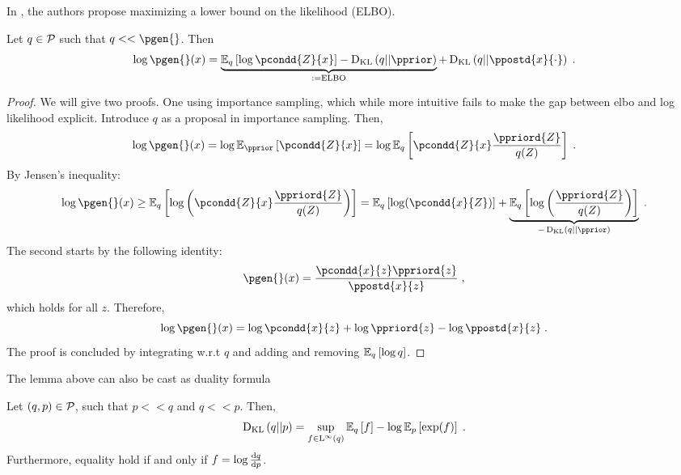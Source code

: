 In \cite{kingma2013autoencoding}, the authors propose maximizing a lower bound on the likelihood (ELBO).
\begin{lemma}
    Let $q \in \mathcal{P}_{}$ such that $q << \pgen{}$. Then
    \begin{equation}
        \label{eq:vae:elbo}
        \log \pgen{}(\lstate) = \underbrace{\PE{q}{\log\pcondd{Z}{\lstate}} - \kl{q}{\pprior}}_{\eqdef \text{ELBO}} + \kl{q}{\ppostd{\lstate}{\cdot}} \eqsp.
    \end{equation}
\end{lemma}
\begin{proof}
    We will give two proofs. One using importance sampling, which while more intuitive fails to make the gap between elbo and log likelihood explicit.
    Introduce $q$ as a proposal in importance sampling. Then, 
    \begin{equation*}
        \log \pgen{}(\lstate) = \log \PE{\pprior}{\pcondd{Z}{\lstate}} = \log \PE{q}{\pcondd{Z}{\lstate}\frac{\ppriord{Z}}{q(Z)}} \eqsp.
    \end{equation*}
    By Jensen's inequality:
    \begin{equation*}
        \log \pgen{}(\lstate) \geq\PE{q}{\log\left(\pcondd{Z}{\lstate}\frac{\ppriord{Z}}{q(Z)}\right)} = \PE{q}{\log(\pcondd{\lstate}{Z})} + \underbrace{\PE{q}{\log\left(\frac{\ppriord{Z}}{q(Z)}\right)}}_{-\kl{q}{\pprior}} \eqsp.
    \end{equation*}
    The second starts by the following identity:
    \begin{equation*}
        \pgen{}(\lstate) = \frac{\pcondd{\lstate}{z} \ppriord{z}}{\ppostd{\lstate}{z}} \eqsp, 
    \end{equation*}
    which holds for all $z$.
    Therefore,
    \begin{equation*}
        \log \pgen{}(\lstate) = \log \pcondd{\lstate}{z} + \log \ppriord{z} - \log {\ppostd{\lstate}{z}} \eqsp. 
    \end{equation*}
    The proof is concluded by integrating w.r.t $q$ and adding and removing $\mathbb{E}_{q}\left[\log q\right]$.
\end{proof}
The lemma above can also be cast as duality formula
\begin{theorem}
    Let $(q, p) \in \mathcal{P}_{}$, such that $p << q$ and $q << p$. Then, 
    \begin{equation}
        \operatorname{D}_{\operatorname{KL}}\left(q||p\right) = \sup_{f \in \operatorname{L}^{\infty}(q)} \mathbb{E}_{q}\left[f\right] - \log \mathbb{E}_{p}\left[\exp(f)\right] \;.
    \end{equation}
    Furthermore, equality hold if and only if $f = \log \frac{\mathrm{d} q}{\mathrm{d} p}$.
\end{theorem}
